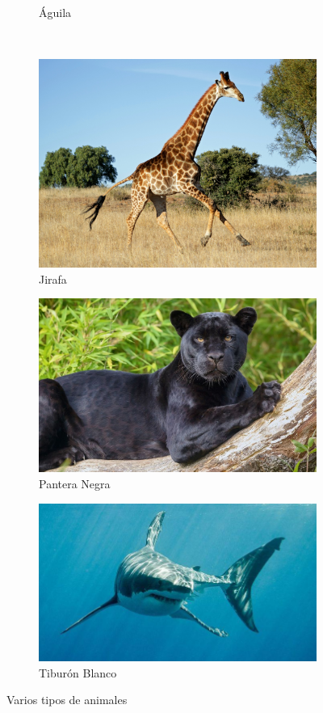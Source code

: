 \documentclass{article}
\begin{document}
\begin{figure}[h!]
\begin{subfigure}[b]{0.4\textwidth}
      \caption{Águila}
      \label{fig:aguila}
    \end{subfigure} \\ [1ex]
    \begin{subfigure}[b]{0.3\textwidth}
      \centering
      \includegraphics[height=0.5\linewidth]{../jirafa}
      \caption{Jirafa}
      \label{fig:jirafa}
    \end{subfigure}
    \begin{subfigure}[b]{0.3\textwidth}
      \centering
      \includegraphics[height=0.5\linewidth]{../pantera}
      \caption{Pantera Negra}
      \label{fig:pantera}
    \end{subfigure}
    \begin{subfigure}[b]{0.3\textwidth}
      \centering
      \includegraphics[height=0.5\linewidth]{../tiburon}
      \caption{Tiburón Blanco}
      \label{fig:tiburon}
    \end{subfigure}

  \caption{Varios tipos de animales}
  \label{fig:animales}
  \end{figure}
\end{document}
